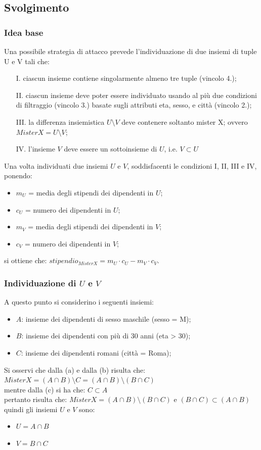\subsection{Svolgimento}
\subsubsection{Idea base}
Una possibile strategia di attacco prevede l'individuazione di due insiemi di tuple U e V tali che:
\begin{enumerate}
\item [I.] ciascun insieme contiene singolarmente almeno tre tuple (vincolo 4.);
\item [II.] ciascun insieme deve poter essere individuato usando al più due condizioni di filtraggio (vincolo 3.) basate sugli attributi eta, sesso, e città (vincolo 2.);
\item [III.] la differenza insiemistica $U \setminus V$ deve contenere soltanto mister X; ovvero ${Mister X} = U \setminus V$;
\item [IV.] l'insieme $V$ deve essere un sottoinsieme di $U$, i.e. $V \subset U$
\end{enumerate}
Una volta individuati due insiemi $U$ e $V$, soddisfacenti le condizioni I, II, III e IV, ponendo:
\begin{itemize}
\item $m_{U}$ = media degli stipendi dei dipendenti in $U$;
\item $c_{U}$ = numero dei dipendenti in $U$;
\item $m_{V}$ = media degli stipendi dei dipendenti in $V$;
\item $c_{V}$ = numero dei dipendenti in $V$;
\end{itemize}
si ottiene che: $stipendio_{Mister X} = m_{U} \cdot c_{U} - m_{V} \cdot c_{V}$.\\
\subsubsection{Individuazione di $U$ e $V$}
A questo punto si considerino i seguenti insiemi:
\begin{itemize}
\item $A$: insieme dei dipendenti di sesso maschile (sesso = M);
\item $B$: insieme dei dipendenti con più di 30 anni (eta > 30);
\item $C$: insieme dei dipendenti romani (città = Roma);
\end{itemize}
Si osservi che dalla (a) e dalla (b) risulta che: ${Mister X} = (A \cap B) \setminus C = (A \cap B) \setminus (B \cap C)$\\
mentre dalla (c) si ha che: $C \subset A$\\
pertanto risulta che: ${Mister X} = (A \cap B) \setminus (B \cap C)$ e $(B \cap C) \subset (A \cap B)$\\
quindi gli insiemi $U$ e $V$ sono:
\begin{itemize}
\item $U = A \cap B$
\item $V = B \cap C$
\end{itemize}

